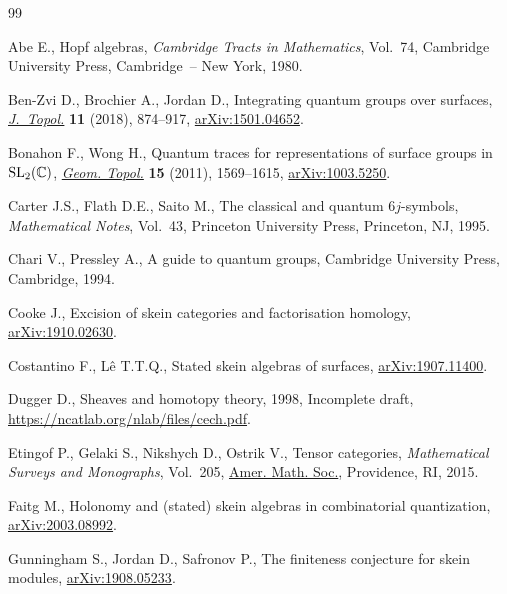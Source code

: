 \documentclass[pdftex]{sigma}%
\numberwithin{equation}{section}
\begin{document}

\begin{thebibliography}{99}
\footnotesize\itemsep=0pt

Abe E., Hopf algebras, \textit{Cambridge Tracts in Mathematics}, Vol.~74,
 Cambridge University Press, Cambridge~-- New York, 1980.

Ben-Zvi D., Brochier A., Jordan D., Integrating quantum groups over surfaces,
 \href{https://doi.org/10.1112/topo.12072}{\textit{J.~Topol.}} \textbf{11} (2018), 874--917, \href{http://arxiv.org/abs/1501.04652}{arXiv:1501.04652}.

Bonahon F., Wong H., Quantum traces for representations of surface groups in
 {${\rm SL}_2(\mathbb C)$}, \href{https://doi.org/10.2140/gt.2011.15.1569}{\textit{Geom. Topol.}} \textbf{15} (2011),
 1569--1615, \href{http://arxiv.org/abs/1003.5250}{arXiv:1003.5250}.

Carter J.S., Flath D.E., Saito M., The classical and quantum 6{$j$}-symbols,
 \textit{Mathematical Notes}, Vol.~43, Princeton University Press, Princeton,
 NJ, 1995.

Chari V., Pressley A., A guide to quantum groups, Cambridge University Press,
 Cambridge, 1994.

Cooke J., Excision of skein categories and factorisation homology,
 \href{http://arxiv.org/abs/1910.02630}{arXiv:1910.02630}.

Costantino F., L\^e T.T.Q., Stated skein algebras of surfaces,
 \href{http://arxiv.org/abs/1907.11400}{arXiv:1907.11400}.

Dugger D., Sheaves and homotopy theory, 1998, {I}ncomplete draft,
 \url{https://ncatlab.org/nlab/files/cech.pdf}.

Etingof P., Gelaki S., Nikshych D., Ostrik V., Tensor categories,
 \textit{Mathematical Surveys and Monographs}, Vol.~205, \href{https://doi.org/10.1090/surv/205}{Amer. Math. Soc.},
 Providence, RI, 2015.

Faitg M., Holonomy and (stated) skein algebras in combinatorial quantization,
 \href{http://arxiv.org/abs/2003.08992}{arXiv:2003.08992}.

Gunningham S., Jordan D., Safronov P., The finiteness conjecture for skein
 modules, \href{http://arxiv.org/abs/1908.05233}{arXiv:1908.05233}.


\end{thebibliography}
\end{document}
